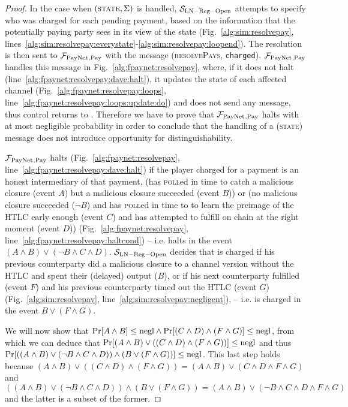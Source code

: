 \begin{proof}
  In the case when $\left(\textsc{state}, \Sigma\right)$ is handled,
  $\mathcal{S}_{\mathrm{LN - Reg - Open}}$ attempts to specify who was charged
  for each pending payment, based on the information that the potentially paying
  party sees in its view of the \ledger{} state (Fig.~\ref{alg:sim:resolvepay},
  lines~\ref{alg:sim:resolvepay:everystate}-\ref{alg:sim:resolvepay:loopend}).
  The resolution is then sent to $\mathcal{F}_{\mathrm{PayNet}}{}_{\mathrm{, Pay}}$ with the message
  (\textsc{resolvePays}, \texttt{charged}). $\mathcal{F}_{\mathrm{PayNet}}{}_{\mathrm{, Pay}}$
  handles this message in Fig.~\ref{alg:fpaynet:resolvepay}, where, if it does
  not halt (line~\ref{alg:fpaynet:resolvepay:dave:halt}), it updates the state
  of each affected channel (Fig.~\ref{alg:fpaynet:resolvepay:loops},
  line~\ref{alg:fpaynet:resolvepay:loops:update:do}) and does not send any
  message, thus control returns to \environment. Therefore we have to prove that
  $\mathcal{F}_{\mathrm{PayNet}}{}_{\mathrm{, Pay}}$ halts with at most negligible probability in
  order to conclude that the handling of a (\textsc{state}) message does not
  introduce opportunity for distinguishability.

  $\mathcal{F}_{\mathrm{PayNet}}{}_{\mathrm{, Pay}}$ halts (Fig.~\ref{alg:fpaynet:resolvepay},
  line~\ref{alg:fpaynet:resolvepay:dave:halt}) if the player \dave{} charged for
  a payment is an honest intermediary of that payment, (has \textsc{poll}ed in
  time to catch a malicious closure (event $A$) but a malicious closure
  succeeded (event $B$)) or (no malicious closure succeeded ($\neg B$) and
  \dave{} has \textsc{poll}ed in time to to learn the preimage of the HTLC early
  enough (event $C$) and has attempted to fulfill on chain at the right moment
  (event $D$)) (Fig.~\ref{alg:fpaynet:resolvepay},
  line~\ref{alg:fpaynet:resolvepay:haltcond}) -- i.e. halts in the event $(A
  \wedge B) \vee (\neg B \wedge C \wedge D)$. $\mathcal{S}_{\mathrm{LN - Reg -
  Open}}$ decides that \dave{} is charged if his previous counterparty did a
  malicious closure to a channel version without the HTLC and spent their
  (delayed) output ($B$), or if his next counterparty fulfilled (event $F$) and
  his previous counterparty timed out the HTLC (event $G$)
  (Fig.~\ref{alg:sim:resolvepay}, line~\ref{alg:sim:resolvepay:negligent}), --
  i.e. \dave{} is charged in the event $B \vee (F \wedge G)$.

  We will now show that $\Pr[A \wedge B] \leq \text{negl} \wedge \Pr[(C \wedge D)
  \wedge (F \wedge G)] \leq \text{negl}$, from which we can deduce that $\Pr[(A \wedge
  B) \vee ((C \wedge D) \wedge (F \wedge G))] \leq \text{negl}$ and thus $\Pr[((A
  \wedge B) \vee (\neg B \wedge C \wedge D)) \wedge (B \vee (F \wedge G))] \leq
  \text{negl}$. This last step holds because $(A \wedge B) \vee ((C \wedge D) \wedge
  (F \wedge G)) = (A \wedge B) \vee (C \wedge D \wedge F \wedge G)$ and $((A
  \wedge B) \vee (\neg B \wedge C \wedge D)) \wedge (B \vee (F \wedge G)) = (A
  \wedge B) \vee (\neg B \wedge C \wedge D \wedge F \wedge G)$ and the latter is
  a subset of the former.


\end{proof}

